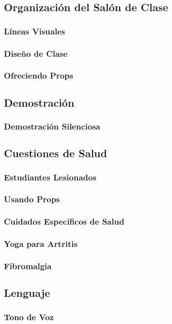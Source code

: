 \documentclass[a4paper]{book}
\begin{document}
\subsection{Organización del Salón de Clase}
\subsubsection{Líneas Visuales}
\subsubsection{Diseño de Clase}
\subsubsection{Ofreciendo Props}
\subsection{Demostración}
\subsubsection{Demostración Silenciosa}
\subsection{Cuestiones de Salud}
\subsubsection{Estudiantes Lesionados}
\subsubsection{Usando Props}
\subsubsection{Cuidados Específicos de Salud}
\subsubsection{Yoga para Artritis}
\subsubsection{Fibromalgia}
\subsection{Lenguaje}
\subsubsection{Tono de Voz}
\end{document}
